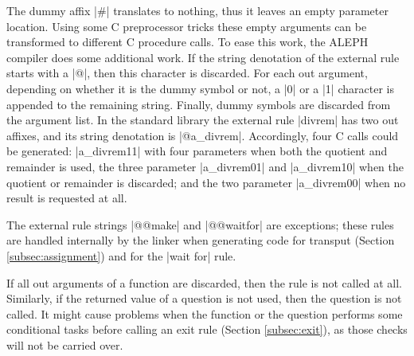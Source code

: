 \documentclass[titlepage]{article}
\newcommand\A{\textsf{ALEPH}}
\newcommand\g[1]{\textsf{\color{blue!90!black}#1}}
\begin{document}
The \g{dummy affix} \pp|\#| translates to nothing, thus it leaves an empty
parameter location. Using some {\sf C} preprocessor tricks these empty
arguments can be transformed to different {\sf C} procedure calls. To ease
this work, the \A{} compiler does some additional work. If the \g{string
denotation} of the external rule starts with a \pp|@|, then this character
is discarded. For each out argument, depending on whether it is the \g{dummy
symbol} or not, a \pp|0| or a \pp|1| character is appended to the remaining
string. Finally, \g{dummy symbol}s are discarded from the argument list. In
the standard library the external rule \pp|divrem| has two out affixes, and
its \g{string denotation} is \pp|@a_divrem|. Accordingly, four {\sf C} calls
could be generated: \pp|a\_divrem11| with four parameters when both the
quotient and remainder is used, the three parameter \pp|a\_divrem01| and
\pp|a\_divrem10| when the quotient or remainder is discarded; and the two
parameter \pp|a\_divrem00| when no result is requested at all.

The external rule strings \pp|@@make| and \pp|@@waitfor| are exceptions;
these rules are handled internally by the linker when generating code for
transput (Section \ref{subsec:assignment}) and for the \pp|wait for| rule.

If all out arguments of a function are discarded, then the rule is not
called at all. Similarly, if the returned value of a question is not used,
then the question is not called. It might cause problems when the function
or the question performs some conditional tasks before calling an \g{exit} rule
(Section \ref{subsec:exit}), as those checks will not be carried over.


\end{document}
